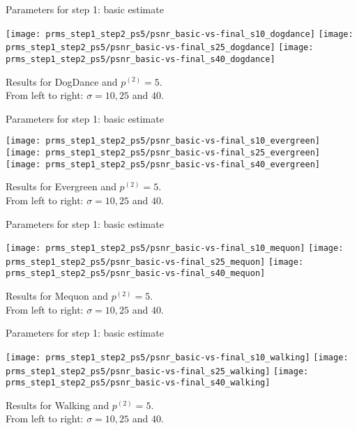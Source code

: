 \documentclass[mathserif, 8pt]{beamer}
\makeatletter
\newcounter{multipleslide}
\newcommand{\restoreframe}{%
\patchcmd{\beamer@@tmpl@footline}%
	{\themultipleslide}%
	{\insertframenumber}%
	{}%
	{}%
\setcounter{framenumber}{\value{multipleslide}}%
}
\makeatother
\begin{document}
\begin{frame}{Parameters for step 1: basic estimate}
	\begin{center}
		\texttt{[image: prms\_step1\_step2\_ps5/psnr\_basic-vs-final\_s10\_dogdance]}%
		\texttt{[image: prms\_step1\_step2\_ps5/psnr\_basic-vs-final\_s25\_dogdance]}%
		\texttt{[image: prms\_step1\_step2\_ps5/psnr\_basic-vs-final\_s40\_dogdance]}

		\bigskip

		Results for DogDance and $p^{(2)} = 5$.\\From left to right: $\sigma = 10, 25$ and $40$.
	\end{center}
\end{frame}
\begin{frame}{Parameters for step 1: basic estimate}
	\begin{center}
		\texttt{[image: prms\_step1\_step2\_ps5/psnr\_basic-vs-final\_s10\_evergreen]}%
		\texttt{[image: prms\_step1\_step2\_ps5/psnr\_basic-vs-final\_s25\_evergreen]}%
		\texttt{[image: prms\_step1\_step2\_ps5/psnr\_basic-vs-final\_s40\_evergreen]}

		\bigskip

		Results for Evergreen and $p^{(2)} = 5$.\\From left to right: $\sigma = 10, 25$ and $40$.
	\end{center}
\end{frame}
\begin{frame}{Parameters for step 1: basic estimate}
	\begin{center}
		\texttt{[image: prms\_step1\_step2\_ps5/psnr\_basic-vs-final\_s10\_mequon]}%
		\texttt{[image: prms\_step1\_step2\_ps5/psnr\_basic-vs-final\_s25\_mequon]}%
		\texttt{[image: prms\_step1\_step2\_ps5/psnr\_basic-vs-final\_s40\_mequon]}

		\bigskip

		Results for Mequon and $p^{(2)} = 5$.\\From left to right: $\sigma = 10, 25$ and $40$.
	\end{center}
\end{frame}
\begin{frame}{Parameters for step 1: basic estimate}
	\begin{center}
		\texttt{[image: prms\_step1\_step2\_ps5/psnr\_basic-vs-final\_s10\_walking]}%
		\texttt{[image: prms\_step1\_step2\_ps5/psnr\_basic-vs-final\_s25\_walking]}%
		\texttt{[image: prms\_step1\_step2\_ps5/psnr\_basic-vs-final\_s40\_walking]}

		\bigskip

		Results for Walking and $p^{(2)} = 5$.\\From left to right: $\sigma = 10, 25$ and $40$.
	\end{center}
\end{frame}
\restoreframe
\end{document}
